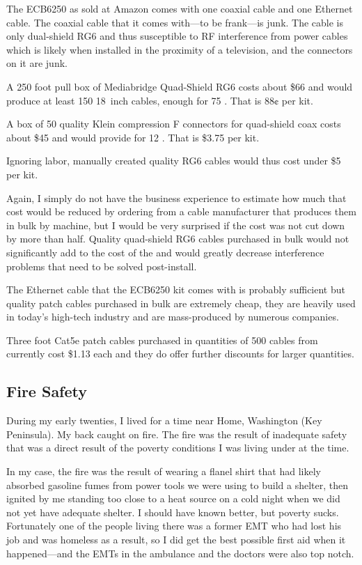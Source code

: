 The ECB6250 as sold at Amazon comes with one coaxial cable and one Ethernet cable. The coaxial
cable that it comes with---to be frank---is junk. The cable is only dual-shield RG6 and thus susceptible
to RF interference from power cables which is likely when installed in the proximity of a television,
and the connectors on it are junk.

A 250 foot pull box of Mediabridge Quad-Shield RG6 costs about \$66 and would produce at least 150
\qty{18}{inch} cables, enough for 75 . That is 88¢ per kit.

A box of 50 quality Klein compression F connectors for quad-shield coax costs about \$45 and would
provide for 12 . That is \$3.75 per kit.

Ignoring labor, manually created quality RG6 cables would thus cost under \$5 per kit.

Again, I simply do not have the business experience to estimate how much that cost would be reduced
by ordering from a cable manufacturer that produces them in bulk by machine, but I would be very
surprised if the cost was not cut down by more than half. Quality quad-shield RG6 cables purchased in bulk
would not significantly add to the cost of the  and would greatly decrease
interference problems that need to be solved post-install.

The Ethernet cable that the ECB6250 kit comes with is probably sufficient but quality patch cables
purchased in bulk are extremely cheap, they are heavily used in today's high-tech industry and are
mass-produced by numerous companies.

Three foot Cat5e patch cables purchased in quantities of 500 cables from
 currently cost \$1.13 each and they do offer further
discounts for larger quantities.

\subsection{Fire Safety}

During my early twenties, I lived for a time near Home, Washington (Key Peninsula). My back caught
on fire. The fire was the result of inadequate safety that was a direct result of the poverty conditions
I was living under at the time.

In my case, the fire was the result of wearing a flanel shirt that had likely absorbed gasoline fumes from
power tools we were using to build a shelter, then ignited by me standing too close to a heat source on a
cold night when we did not yet have adequate shelter. I should have known better, but poverty sucks.
Fortunately one of the people living there was a former EMT who had lost his job and was homeless as a
result, so I did get the best possible first aid when it happened---and the EMTs in the ambulance and the
doctors were also top notch.

